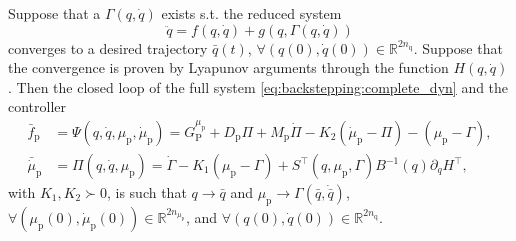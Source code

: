 \begin{theorem}\label{theorem:backstepping:backstepping_controller}
	Suppose that a $\Gamma(q,\dot{q})$ exists s.t. the reduced system
	\begin{equation}\label{eq:backstepping:reduced_sys}
		\ddot{q} = f(q,\dot{q}) + g(q,\Gamma(q,\dot{q}))
	\end{equation}
	converges to a desired trajectory $\bar{q}(t)$, $\forall (q(0),\dot{q}(0)) \in \mathbb{R}^{2 n_{\mathrm{q}}}$. Suppose that the convergence is proven by Lyapunov arguments through the function $H(q,\dot{q})$. Then the closed loop of the full system \eqref{eq:backstepping:complete_dyn} and the controller
	\begin{equation}\label{eq:backstepping:pi_psi}
		\begin{split}
			\bar{f}_\mathrm{p} &= \Psi(q,\dot{q},\mu_\mathrm{p},\dot{\mu}_\mathrm{p}) = G_{\mathrm{P}}^{\mu_\mathrm{p}} + D_\mathrm{p} \Pi + M_\mathrm{p} \dot{\Pi} - K_2 (\dot{\mu}_\mathrm{p} - \Pi) - (\mu_\mathrm{p} - \Gamma),\\
			\bar{\dot{\mu}}_\mathrm{p} &= \Pi(q,\dot{q},\mu_\mathrm{p}) = \dot{\Gamma} - K_1 (\mu_\mathrm{p} - \Gamma) 
			+ S^{\top}(q,\mu_\mathrm{p},\Gamma)B^{-1}(q)\partial_{\dot{q}} H^{\top},
		\end{split}
	\end{equation}
	with $K_1,K_2 \succ 0$, is such that $q \rightarrow \bar{q}$ and $\mu_\mathrm{p} \rightarrow \Gamma(\bar q,\dot{\bar q})$, $\forall (\mu_\mathrm{p}(0),\dot{\mu}_\mathrm{p}(0)) \in \mathbb{R}^{2n_{\mu_\mathrm{p}}}$, and $\forall (q(0),\dot{q}(0)) \in \mathbb{R}^{2 n_{\mathrm{q}}}$.
\end{theorem}
